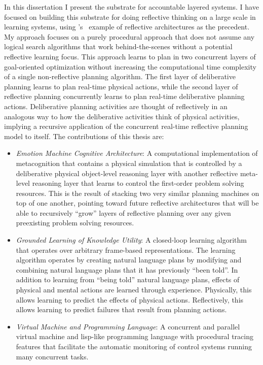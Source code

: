 In this dissertation I present the substrate for accountable layered
systems.  I have focused on building this substrate for doing
reflective thinking on a large scale in learning systems, using
{\mbox{\citeauthor{singh:2005b}'s~\citeyearpar{singh:2005b}}} example
of reflective architectures as the precedent.  My approach focuses on
a purely procedural approach that does not assume any logical search
algorithms that work behind-the-scenes without a potential reflective
learning focus.  This approach learns to plan in two concurrent layers
of goal-oriented optimization without increasing the computational
time complexity of a single non-reflective planning algorithm.  The
first layer of deliberative planning learns to plan real-time physical
actions, while the second layer of reflective planning concurrently
learns to plan real-time deliberative planning actions.  Deliberative
planning activities are thought of reflectively in an analogous way to
how the deliberative activities think of physical activities, implying
a recursive application of the concurrent real-time reflective
planning model to itself.  The contributions of this thesis are:

\begin{itemize}
\item \emph{Emotion Machine Cognitive Architecture}: A computational
  implementation of metacognition that contains a physical simulation
  that is controlled by a deliberative physical object-level reasoning
  layer with another reflective meta-level reasoning layer that learns
  to control the first-order problem solving resources.  This is the
  result of stacking two very similar planning machines on top of one
  another, pointing toward future reflective architectures that will
  be able to recursively ``grow'' layers of reflective planning over
  any given preexisting problem solving resources.
\item \emph{Grounded Learning of Knowledge Utility}: A closed-loop
  learning algorithm that operates over arbitrary frame-based
  representations.  The learning algorithm operates by creating
  natural language plans by modifying and combining natural language
  plans that it has previously ``been told''.  In addition to learning
  from ``being told'' natural language plans, effects of physical and
  mental actions are learned through experience.  Physically, this
  allows learning to predict the effects of physical actions.
  Reflectively, this allows learning to predict failures that result
  from planning actions.
\item \emph{Virtual Machine and Programming Language}: A concurrent
  and parallel virtual machine and lisp-like programming language with
  procedural tracing features that facilitate the automatic monitoring
  of control systems running many concurrent tasks.
\end{itemize}

